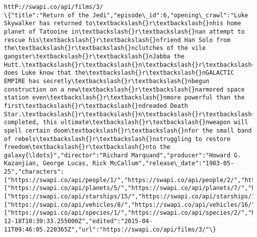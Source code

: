 \documentclass[11pt]{article}
\begin{document}
\begin{Verbatim}[commandchars=\\\{\}]
httP://swapi.co/api/films/3/
\{"title":"Return of the Jedi","episode\_id":6,"opening\_crawl":"Luke Skywalker has returned to\textbackslash{}r\textbackslash{}nhis home planet of Tatooine in\textbackslash{}r\textbackslash{}nan attempt to rescue his\textbackslash{}r\textbackslash{}nfriend Han Solo from the\textbackslash{}r\textbackslash{}nclutches of the vile gangster\textbackslash{}r\textbackslash{}nJabba the Hutt.\textbackslash{}r\textbackslash{}n\textbackslash{}r\textbackslash{}nLittle does Luke know that the\textbackslash{}r\textbackslash{}nGALACTIC EMPIRE has secretly\textbackslash{}r\textbackslash{}nbegun construction on a new\textbackslash{}r\textbackslash{}narmored space station even\textbackslash{}r\textbackslash{}nmore powerful than the first\textbackslash{}r\textbackslash{}ndreaded Death Star.\textbackslash{}r\textbackslash{}n\textbackslash{}r\textbackslash{}nWhen completed, this ultimate\textbackslash{}r\textbackslash{}nweapon will spell certain doom\textbackslash{}r\textbackslash{}nfor the small band of rebels\textbackslash{}r\textbackslash{}nstruggling to restore freedom\textbackslash{}r\textbackslash{}nto the galaxy{\ldots}","director":"Richard Marquand","producer":"Howard G. Kazanjian, George Lucas, Rick McCallum","release\_date":"1983-05-25","characters":["https://swapi.co/api/people/1/","https://swapi.co/api/people/2/","https://swapi.co/api/people/3/","https://swapi.co/api/people/4/","https://swapi.co/api/people/5/","https://swapi.co/api/people/10/","https://swapi.co/api/people/13/","https://swapi.co/api/people/14/","https://swapi.co/api/people/16/","https://swapi.co/api/people/18/","https://swapi.co/api/people/20/","https://swapi.co/api/people/21/","https://swapi.co/api/people/22/","https://swapi.co/api/people/25/","https://swapi.co/api/people/27/","https://swapi.co/api/people/28/","https://swapi.co/api/people/29/","https://swapi.co/api/people/30/","https://swapi.co/api/people/31/","https://swapi.co/api/people/45/"],"planets":["https://swapi.co/api/planets/5/","https://swapi.co/api/planets/7/","https://swapi.co/api/planets/8/","https://swapi.co/api/planets/9/","https://swapi.co/api/planets/1/"],"starships":["https://swapi.co/api/starships/15/","https://swapi.co/api/starships/10/","https://swapi.co/api/starships/11/","https://swapi.co/api/starships/12/","https://swapi.co/api/starships/22/","https://swapi.co/api/starships/23/","https://swapi.co/api/starships/27/","https://swapi.co/api/starships/28/","https://swapi.co/api/starships/29/","https://swapi.co/api/starships/3/","https://swapi.co/api/starships/17/","https://swapi.co/api/starships/2/"],"vehicles":["https://swapi.co/api/vehicles/8/","https://swapi.co/api/vehicles/16/","https://swapi.co/api/vehicles/18/","https://swapi.co/api/vehicles/19/","https://swapi.co/api/vehicles/24/","https://swapi.co/api/vehicles/25/","https://swapi.co/api/vehicles/26/","https://swapi.co/api/vehicles/30/"],"species":["https://swapi.co/api/species/1/","https://swapi.co/api/species/2/","https://swapi.co/api/species/3/","https://swapi.co/api/species/5/","https://swapi.co/api/species/6/","https://swapi.co/api/species/8/","https://swapi.co/api/species/9/","https://swapi.co/api/species/10/","https://swapi.co/api/species/15/"],"created":"2014-12-18T10:39:33.255000Z","edited":"2015-04-11T09:46:05.220365Z","url":"https://swapi.co/api/films/3/"\}

\end{Verbatim}
\end{document}
